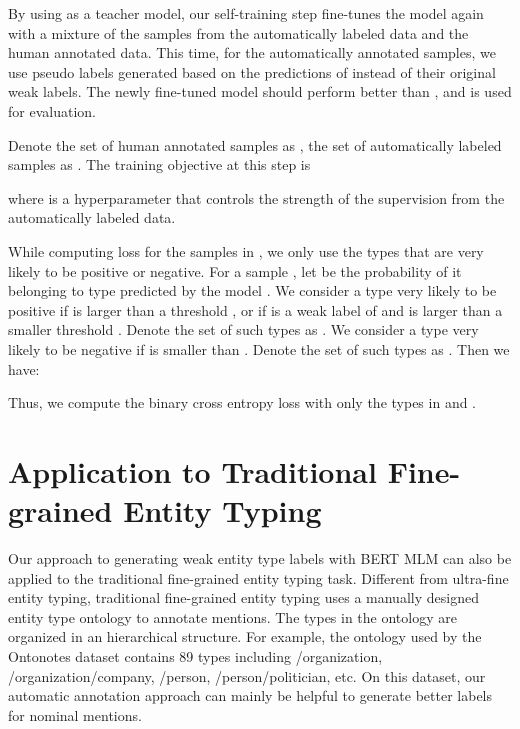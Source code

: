 \documentclass[11pt,a4paper]{article}
\begin{document}
By using  as a teacher model, our self-training step fine-tunes the model  again with a mixture of the samples from the automatically labeled data and the human annotated data. This time, for the automatically annotated samples, we use pseudo labels generated based on the predictions of  instead of their original weak labels. The newly fine-tuned model should perform better than , and is used for evaluation.

Denote the set of human annotated samples as , the set of automatically labeled samples as . The training objective at this step is 

where  is a hyperparameter that controls the strength of the supervision from the automatically labeled data.

While computing loss for the samples in , we only use the types that are very likely to be positive or negative. For a sample , let  be the probability of it belonging to type  predicted by the model . We consider a type  very likely to be positive if  is larger than a threshold , or if  is a weak label of  and  is larger than a smaller threshold . Denote the set of such types as . We consider a type  very likely to be negative if  is smaller than . Denote the set of such types as . Then we have:

Thus, we compute the binary cross entropy loss with only the types in  and .


\section{Application to Traditional Fine-grained Entity Typing}
\label{sec:fine-grained-app}

Our approach to generating weak entity type labels with BERT MLM can also be applied to the traditional fine-grained entity typing task. Different from ultra-fine entity typing, traditional fine-grained entity typing uses a manually designed entity type ontology to annotate mentions. The types in the ontology are organized in an hierarchical structure. For example, the ontology used by the Ontonotes dataset contains 89 types including /organization, /organization/company, /person, /person/politician, etc. On this dataset, our automatic annotation approach can mainly be helpful to generate better labels for nominal mentions. 
\end{document}
